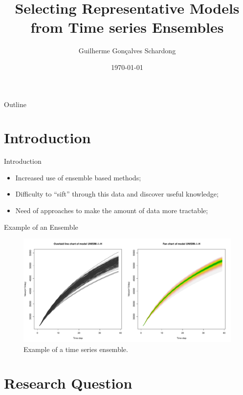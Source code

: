 \documentclass{beamer}
\title{Selecting Representative Models from Time series Ensembles}
\author{Guilherme Gon\c{c}alves Schardong}
\date{\today}
\begin{document}
	
\begin{frame}
  \titlepage
\end{frame}

\begin{frame}{Outline}
  \tableofcontents
\end{frame}

\section{Introduction}
\begin{frame}
  \tableofcontents[currentsection]
\end{frame}

\begin{frame}{Introduction}
  \begin{itemize}
    \item Increased use of ensemble based methods;
    \item Difficulty to ``sift'' through this data and discover useful knowledge;
    \item Need of approaches to make the amount of data more tractable;
  \end{itemize}
\end{frame}

\begin{frame}{Example of an Ensemble}
  \begin{figure}
    \includegraphics[width=\columnwidth]{line-fan.pdf}
    \caption{Example of a time series ensemble.}
    \label{fig:sample}
  \end{figure}
\end{frame}

\section{Research Question}
\begin{frame}
  \tableofcontents[currentsection]
\end{frame}
\end{document}
